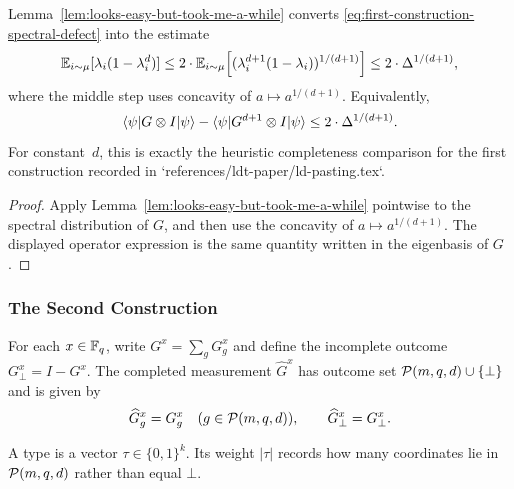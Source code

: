 \begin{corollary}\label{cor:first-construction-completeness-comparison}
	Lemma~\ref{lem:looks-easy-but-took-me-a-while} converts
	\eqref{eq:first-construction-spectral-defect} into the estimate
	\[
		\mathbb{E}_{i\sim\mu}[\lambda_i(1-\lambda_i^d)]
		\le 2\cdot \mathbb{E}_{i\sim\mu}\Big[(\lambda_i^{d+1}(1-\lambda_i))^{1/(d+1)}\Big]
		\le 2\cdot \Delta^{1/(d+1)},
	\]
	where the middle step uses concavity of $a \mapsto a^{1/(d+1)}$. Equivalently,
	\[
		\langle \psi \rvert G \otimes I \lvert \psi \rangle - \langle \psi \rvert G^{d+1} \otimes I \lvert \psi \rangle
		\le 2\cdot \Delta^{1/(d+1)}.
	\]
	For constant~$d$, this is exactly the heuristic completeness comparison for the
	first construction recorded in `references/ldt-paper/ld-pasting.tex`.
\end{corollary}
\begin{proof}
	Apply Lemma~\ref{lem:looks-easy-but-took-me-a-while} pointwise to the
	spectral distribution of \(G\), and then use the concavity of
	\(a \mapsto a^{1/(d+1)}\). The displayed operator expression is the same
	quantity written in the eigenbasis of \(G\).
\end{proof}

\subsubsection{The Second Construction}\label{sec:second-construction}

\begin{definition}\label{def:G-hat}
	\leanok
	For each $x \in \mathbb{F}_q$, write $G^x = \sum_g G_g^x$ and define the incomplete outcome $G_\bot^x = I-G^x$. The completed measurement $\widehat G^x$ has outcome set $\mathcal{P}(m,q,d) \cup \{\bot\}$ and is given by
	\[
		\widehat G_g^x = G_g^x \quad (g \in \mathcal{P}(m,q,d)),
		\qquad
		\widehat G_\bot^x = G_\bot^x.
	\]
\end{definition}

\begin{definition}[Types]\label{def:types}
	\leanok
	A type is a vector $\tau \in \{0,1\}^k$. Its weight $|\tau|$ records how many coordinates lie in $\mathcal{P}(m,q,d)$ rather than equal $\bot$.
\end{definition}

